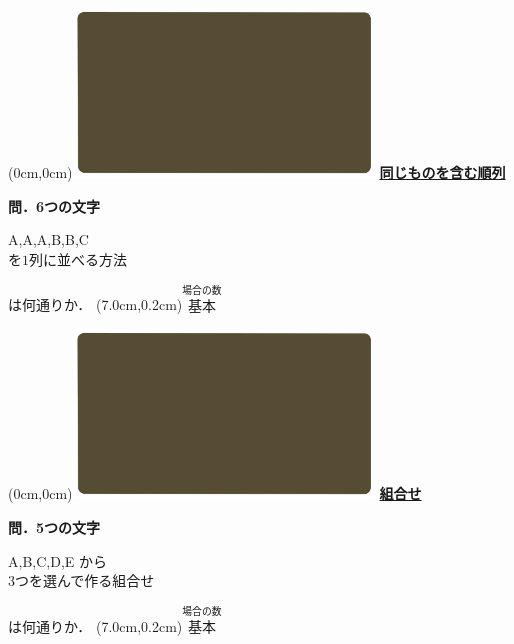 \documentclass[10pt,
fleqn,
dvipdfmx,
uplatex
]{jsarticle}
\begin{document}
\at(0cm,0cm){\includegraphics[width=8cm,bb=0 0 1920 1080]{./youtube/thumbnails/templates/smart_background/場合の数.jpeg}}
{\color{orange}\bf\boldmath\LARGE\underline{同じものを含む順列}}\vspace{0.3zw}

\large
\bf\boldmath 問．6つの文字

\Huge
\vspace{-0.2zw}
A,\;A,\;A,\;B,\;B,\;C\vspace{-0.2zw}\\
\hfill を$1$列に並べる方法
\vspace{0.1zw}

\large
\hfill
は何通りか．
\at(7.0cm,0.2cm){\small\color{bradorange}$\overset{\text{場合の数}}{\text{基本}}$}


\newpage



\at(0cm,0cm){\includegraphics[width=8cm,bb=0 0 1920 1080]{./youtube/thumbnails/templates/smart_background/場合の数.jpeg}}
{\color{orange}\bf\boldmath\huge\underline{組合せ}}\vspace{0.3zw}

\large
\bf\boldmath 問．5つの文字

\huge
\vspace{-0.2zw}
A,\;B,\;C,\;D,\;E から\\
\hfill $3$つを選んで作る組合せ
\vspace{0.1zw}

\large
\hfill
は何通りか．
\at(7.0cm,0.2cm){\small\color{bradorange}$\overset{\text{場合の数}}{\text{基本}}$}
\end{document}
